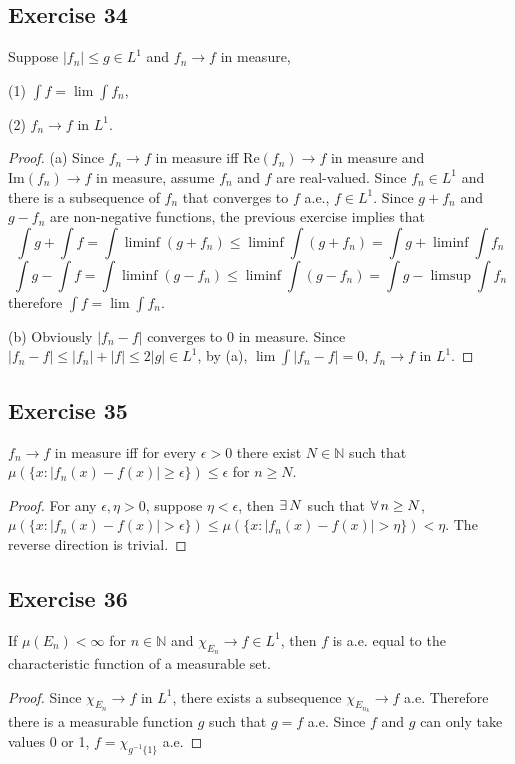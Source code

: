 \subsection*{Exercise 34}
Suppose $|f_n|\le g\in L^1$ and $f_n\to f$ in measure,
\par (1) $\int f=\lim\int f_n$,
\par (2) $f_n\to f$ in $L^1$.
\begin{proof}
    \par (a) Since $f_n\to f$ in measure iff $\mathrm{Re}(f_n)\to f$ in measure and $\mathrm{Im}(f_n)\to f$ in measure, assume $f_n$ and $f$ are real-valued. Since $f_n\in L^1$ and there is a subsequence of $f_n$ that converges to $f$ a.e., $f\in L^1$. Since $g+f_n$ and $g-f_n$ are non-negative functions, the previous exercise implies that
    $$
    \int g+\int f=\int\liminf(g+f_n)\le\liminf\int(g+f_n)=\int g+\liminf\int f_n
    $$
    $$
    \int g-\int f=\int\liminf(g-f_n)\le\liminf\int(g-f_n)=\int g-\limsup\int f_n
    $$
    therefore $\int f=\lim\int f_n$.
    \par (b) Obviously $|f_n-f|$ converges to $0$ in measure. Since $|f_n-f|\le|f_n|+|f|\le 2|g|\in L^1$, by (a), $\lim\int|f_n-f|=0$, $f_n\to f$ in $L^1$.
\end{proof}
\subsection*{Exercise 35}
$f_n\to f$ in measure iff for every $\epsilon>0$ there exist $N\in\mathbb{N}$ such that $\mu(\{x:|f_n(x)-f(x)|\ge\epsilon\})\le\epsilon$ for $n\ge N$.
\begin{proof}
    For any $\epsilon,\eta>0$, suppose $\eta<\epsilon$, then $\exists\, N$ such that $\forall\, n\ge N$, $\mu(\{x:|f_n(x)-f(x)|>\epsilon\})\le\mu(\{x:|f_n(x)-f(x)|>\eta\})<\eta$. The reverse direction is trivial.
\end{proof}
\subsection*{Exercise 36}
If $\mu(E_n)<\infty$ for $n\in\mathbb{N}$ and $\chi_{E_n}\to f\in L^{1}$, then $f$ is a.e. equal to the characteristic function of a measurable set.
\begin{proof}
    Since $\chi_{E_n}\to f$ in $L^1$, there exists a subsequence $\chi_{E_{n_k}}\to f$ a.e. Therefore there is a measurable function $g$ such that $g=f$ a.e. Since $f$ and $g$ can only take values 0 or 1, $f=\chi_{g^{-1}\{1\}}$ a.e.
\end{proof}
